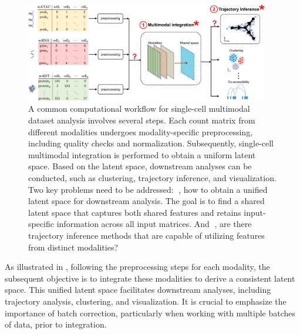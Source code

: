 \begin{figure}[!ht]
	\centering
	\includegraphics[width=0.95\textwidth]{workflow_multimodal/fig}
	\vspace{0.1cm}
	\caption[A common computational multimodal analysis workflow.]{A common computational workflow for single-cell multimodal dataset analysis involves several steps. Each count matrix from different modalities undergoes modality-specific preprocessing, including quality checks and normalization. Subsequently, single-cell multimodal integration is performed to obtain a uniform latent space. Based on the latent space, downstream analyses can be conducted, such as clustering, trajectory inference, and visualization. Two key problems need to be addressed: \textcircled{}, how to obtain a unified latent space for downstream analysis. The goal is to find a shared latent space that captures both shared features and retains input-specific information across all input matrices. And \textcircled{}, are there trajectory inference methods that are capable of utilizing features from distinct modalities?}
	\label{fig:workflow_multimodal}
\end{figure}

 


As illustrated in , following the preprocessing steps for each modality, the subsequent objective is to integrate these modalities to derive a consistent latent space. This unified latent space facilitates downstream analyses, including trajectory analysis, clustering, and visualization. It is crucial to emphasize the importance of batch correction, particularly when working with multiple batches of data, prior to integration.

